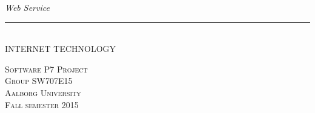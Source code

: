 \thispagestyle{empty}
\begin{flushright}
\vspace{3cm}

\phantom{hul}

\phantom{hul}

\phantom{hul}

\textsl{\Huge Web Service} \\ 


\rule{14cm}{2mm} \\ 
\Huge INTERNET TECHNOLOGY\\ \vspace{1.5cm}

\begin{figure}[H]
\end{figure}
\vspace{2cm} 
\textsc{\Large Software P7 Project \\
Group SW707E15 \\
Aalborg University\\
Fall semester 2015\\}
\end{flushright}
